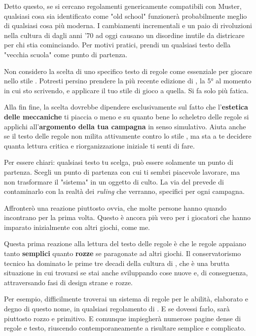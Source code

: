 Detto questo, se si cercano regolamenti genericamente compatibili con Muster, qualsiasi cosa sia identificato come "old school" funzionerà probabilmente meglio di qualsiasi cosa più moderna. I cambiamenti incrementali e un paio di rivoluzioni nella cultura di \dnd{} dagli anni '70 ad oggi causano un disordine inutile da districare per chi stia cominciando. Per motivi pratici, prendi un qualsiasi testo della "vecchia scuola" come punto di partenza.

Non considero la scelta di uno specifico testo di regole come essenziale per giocare nello stile . Potresti persino prendere la più recente edizione di \dnd{}, la 5° al momento in cui sto scrivendo, e applicare il tuo stile di gioco a quella. Si fa solo più fatica.

Alla fin fine, la scelta dovrebbe dipendere esclusivamente sul fatto che l'\textbf{estetica delle meccaniche} ti piaccia o meno e su quanto bene lo scheletro delle regole si applichi all'\textbf{argomento della tua campagna} in senso simulativo. Aiuta anche se il testo delle regole non milita attivamente contro lo stile , ma sta a te decidere quanta lettura critica e riorganizzazione iniziale ti senti di fare.

Per essere chiari: qualsiasi testo tu scelga, può essere solamente un punto di partenza. Scegli un punto di partenza con cui ti sembri piacevole lavorare, ma non trasformare il "sistema" in un oggetto di culto. La via del  prevede di contaminarlo con la realtà dei \textit{ruling} che verranno, specifici per ogni campagna.


Affronterò una reazione piuttosto ovvia, che molte persone hanno quando incontrano \dnd{} per la prima volta. Questo è ancora più vero per i giocatori che hanno imparato inizialmente con altri giochi, come me.

Questa prima reazione alla lettura del testo delle regole è che le regole appaiano tanto \textbf{semplici} quanto \textbf{rozze} se paragonate ad altri giochi. Il conservatorismo tecnico ha dominato le prime tre decadi della cultura di \dnd{}, che è una brutta situazione in cui trovarsi se stai anche sviluppando cose nuove e, di conseguenza, attraversando fasi di design strane e rozze.

Per esempio, difficilmente troverai un sistema di regole per le abilità, elaborato e degno di questo nome, in qualsiasi regolamento di \dnd{}. E se dovessi farlo, sarà piuttosto rozzo e primitivo. E comunque impiegherà numerose pagine dense di regole e testo, riuscendo contemporaneamente a risultare semplice e complicato.

